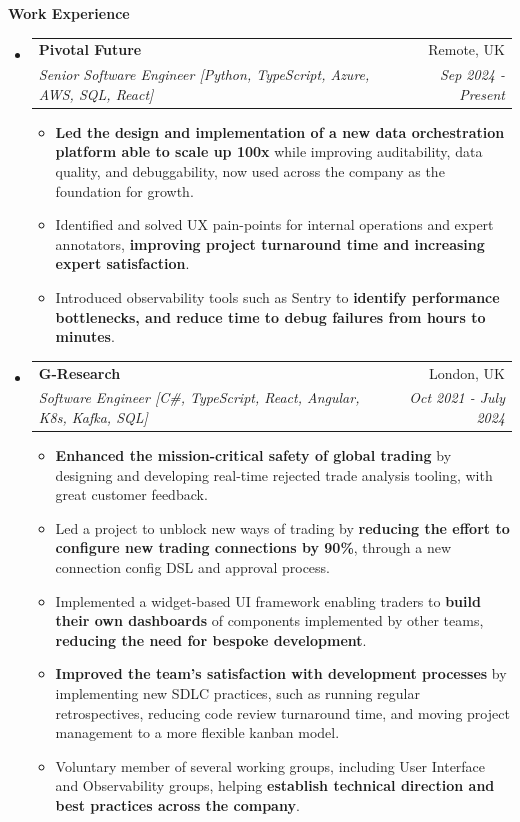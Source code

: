 \documentclass[letterpaper,11pt]{article}
\makeatletter
\newcommand{\resitem}[1]{\item #1 \vspace{-1pt}}
\newcommand{\resheading}[1]{{\large \colorbox{mygrey}{\begin{minipage}{\textwidth}{\textbf{#1 \vphantom{p\^{E}}}}\end{minipage}}}}
\newcommand{\ressubheading}[4]{
\begin{tabular*}{7.0in}{l@{\extracolsep{\fill}}r}
	\textbf{#1} & #2 \\
	\textit{#3} & \textit{#4} \\
\end{tabular*}\vspace{-6pt}}
\makeatother
\begin{document}
\resheading{Work Experience}
\begin{itemize}
	\item
	\ressubheading{Pivotal Future}{Remote, UK}{Senior Software Engineer [Python, TypeScript, Azure, AWS, SQL, React]}{Sep 2024 - Present}
	\begin{itemize}
		\resitem{\textbf{Led the design and implementation of a new data orchestration platform able to scale up 100x} while improving auditability, data quality, and debuggability, now used across the company as the foundation for growth.}
		\resitem{Identified and solved UX pain-points for internal operations and expert annotators, \textbf{improving project turnaround time and increasing expert satisfaction}.}
		\resitem{Introduced observability tools such as Sentry to \textbf{identify performance bottlenecks, and reduce time to debug failures from hours to minutes}.}
	\end{itemize}

	\item
	\ressubheading{G-Research}{London, UK}{Software Engineer [C\#, TypeScript, React, Angular, K8s, Kafka, SQL]}{Oct 2021 - July 2024}
	\begin{itemize}
		\resitem{\textbf{Enhanced the mission-critical safety of global trading} by designing and developing real-time rejected trade analysis tooling, with great customer feedback.}
		\resitem{Led a project to unblock new ways of trading by \textbf{reducing the effort to configure new trading connections by 90\%}, through a new connection config DSL and approval process.}
		\resitem{Implemented a widget-based UI framework enabling traders to \textbf{build their own dashboards} of components implemented by other teams, \textbf{reducing the need for bespoke development}.}
		\resitem{\textbf{Improved the team's satisfaction with development processes} by implementing new SDLC practices, such as running regular retrospectives, reducing code review turnaround time, and moving project management to a more flexible kanban model.}
		\resitem{Voluntary member of several working groups, including User Interface and Observability groups, helping \textbf{establish technical direction and best practices across the company}.}
	\end{itemize}


\end{itemize}
\end{document}
